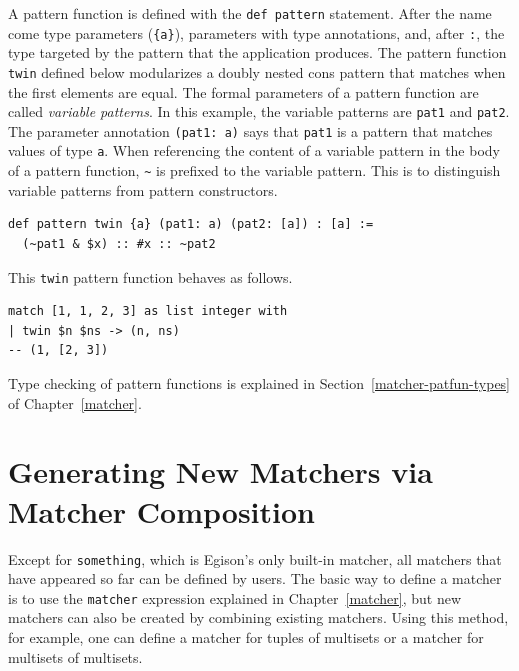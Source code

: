 A pattern function is defined with the \lstinline{def pattern} statement.
After the name come type parameters (\lstinline|{a}|), parameters with type annotations, and, after \lstinline{:}, the type targeted by the pattern that the application produces.
The pattern function \lstinline{twin} defined below modularizes a doubly nested cons pattern that matches when the first elements are equal.
The formal parameters of a pattern function are called \emph{variable patterns}.
In this example, the variable patterns are \lstinline{pat1} and \lstinline{pat2}.
The parameter annotation \lstinline{(pat1: a)} says that \lstinline{pat1} is a pattern that matches values of type \lstinline{a}.
When referencing the content of a variable pattern in the body of a pattern function, \lstinline{~} is prefixed to the variable pattern.
This is to distinguish variable patterns from pattern constructors.
\begin{lstlisting}[language=egison,numbers=none]
def pattern twin {a} (pat1: a) (pat2: [a]) : [a] :=
  (~pat1 & $x) :: #x :: ~pat2
\end{lstlisting}
This \lstinline{twin} pattern function behaves as follows.
\begin{lstlisting}[language=egison,numbers=none]
match [1, 1, 2, 3] as list integer with
| twin $n $ns -> (n, ns)
-- (1, [2, 3])
\end{lstlisting}
Type checking of pattern functions is explained in Section~\ref{matcher-patfun-types} of Chapter~\ref{matcher}.

\section{Generating New Matchers via Matcher Composition}\label{quick-matcher-composition}

Except for \lstinline{something}, which is Egison's only built-in matcher, all matchers that have appeared so far can be defined by users.
The basic way to define a matcher is to use the \lstinline{matcher} expression explained in Chapter~\ref{matcher}, but new matchers can also be created by combining existing matchers.
Using this method, for example, one can define a matcher for tuples of multisets or a matcher for multisets of multisets.

